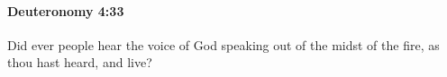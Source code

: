 
		\paragraph{Deuteronomy 4:33} %
			\label{DEUTERONOMY-4-33}

			Did ever people hear the voice of God speaking out of the midst of the fire, as thou hast heard, and live?



